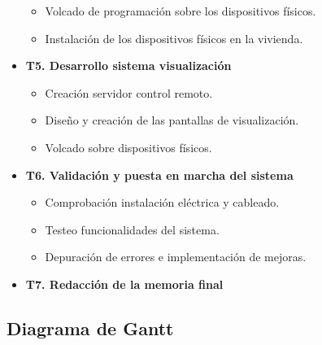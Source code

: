 \begin{itemize}
\begin{itemize}
	\item Volcado de programación sobre los dispositivos físicos.
	\item Instalación de los dispositivos físicos en la vivienda. \\
	\end{itemize} 
\item \textbf{T5. Desarrollo sistema visualización}
	\begin{itemize}
	\item Creación servidor control remoto.
	\item Diseño y creación de las pantallas de visualización.
	\item Volcado sobre dispositivos físicos. \\
	\end{itemize} 
\item \textbf{T6. Validación y puesta en marcha del sistema}
	\begin{itemize}
	\item Comprobación instalación eléctrica y cableado.
	\item Testeo funcionalidades del sistema.
	\item Depuración de errores e implementación de mejoras. \\
	\end{itemize} 
\item \textbf{T7. Redacción de la memoria final} \\
\end{itemize} 

\subsection{Diagrama de Gantt}

